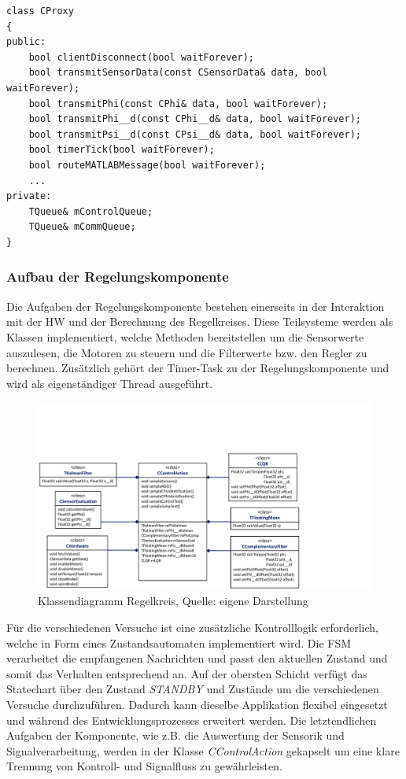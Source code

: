 \newpage
\begin{lstlisting}
class CProxy
{
public:
	bool clientDisconnect(bool waitForever);
	bool transmitSensorData(const CSensorData& data, bool waitForever);
	bool transmitPhi(const CPhi& data, bool waitForever);
	bool transmitPhi__d(const CPhi__d& data, bool waitForever);
	bool transmitPsi__d(const CPsi__d& data, bool waitForever);
	bool timerTick(bool waitForever);
	bool routeMATLABMessage(bool waitForever);
	...
private:
	TQueue& mControlQueue;
	TQueue& mCommQueue;
}
\end{lstlisting}

\subsubsection{Aufbau der Regelungskomponente}
Die Aufgaben der Regelungskomponente bestehen einerseits in der Interaktion mit der HW und der Berechnung des Regelkreises. Diese Teilsysteme werden als Klassen implementiert, welche Methoden bereitstellen um die Sensorwerte auszulesen, die Motoren zu steuern und die Filterwerte bzw. den Regler zu berechnen. Zusätzlich gehört der Timer-Task zu der Regelungskomponente und wird als eigenständiger Thread ausgeführt. 

\begin{figure}[!h]
\centering
\includegraphics[width=\linewidth, trim={0cm 0cm 7cm 5cm}, clip]{img/SW_KontrollKlassen}
\caption{Klassendiagramm Regelkreis, Quelle: eigene Darstellung}
\end{figure}

Für die verschiedenen Versuche ist eine zusätzliche Kontrolllogik erforderlich, welche in Form eines Zustandsautomaten implementiert wird. Die FSM verarbeitet die empfangenen Nachrichten und passt den aktuellen Zustand und somit das Verhalten entsprechend an. Auf der obersten Schicht verfügt das Statechart über den Zustand \textit{STANDBY} und Zustände um die verschiedenen Versuche durchzuführen. Dadurch kann dieselbe Applikation flexibel eingesetzt und während des Entwicklungsprozesses erweitert werden. Die letztendlichen Aufgaben der Komponente, wie z.B. die Auswertung der Sensorik und Signalverarbeitung, werden in der Klasse \textit{CControlAction} gekapselt um eine klare Trennung von Kontroll- und Signalfluss zu gewährleisten.

